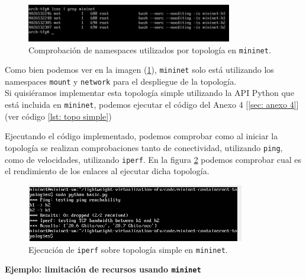 \documentclass[a4paper, oneside, 12pt]{book}
\begin{document}
	\begin{figure}[h!]
		\begin{center}
			\includegraphics[width=0.8\textwidth]{img/mn_single_3.png}
			\caption{Comprobación de namespaces utilizados por topología en \texttt{mininet}.}
			\label{img: lsns mininet 1}	
		\end{center}
	\end{figure}

	\noindent Como bien podemos ver en la imagen (\ref{img: lsns mininet 1}), \texttt{mininet} solo está utilizando los namespaces \texttt{mount} y \texttt{network} para el despliegue de la topología. \\
	
	\noindent Si quisiéramos implementar esta topología simple utilizando la API Python que está incluida en \texttt{mininet}, podemos ejecutar el código del Anexo 4 [\ref{sec: anexo 4}] (ver código \ref{lst: topo simple})
	
	\pagebreak
	
	\noindent Ejecutando el código implementado, podemos comprobar como al iniciar la topología se realizan comprobaciones tanto de conectividad, utilizando \texttt{ping}, como de velocidades, utilizando \texttt{iperf}. En la figura \ref{img: iperf mn simple} podemos comprobar cual es el rendimiento de los enlaces al ejecutar dicha topología.
	
	\begin{figure}[h!]
		\begin{center}
			\includegraphics[width=0.85\textwidth]{img/mn_single_4.png}
			\caption{Ejecución de \texttt{iperf} sobre topología simple en \texttt{mininet}.}
			\label{img: iperf mn simple}	
		\end{center}
	\end{figure}
	
	
	\noindent \textbf{\large Ejemplo: limitación de recursos usando \texttt{mininet}}\\
	
\end{document}

